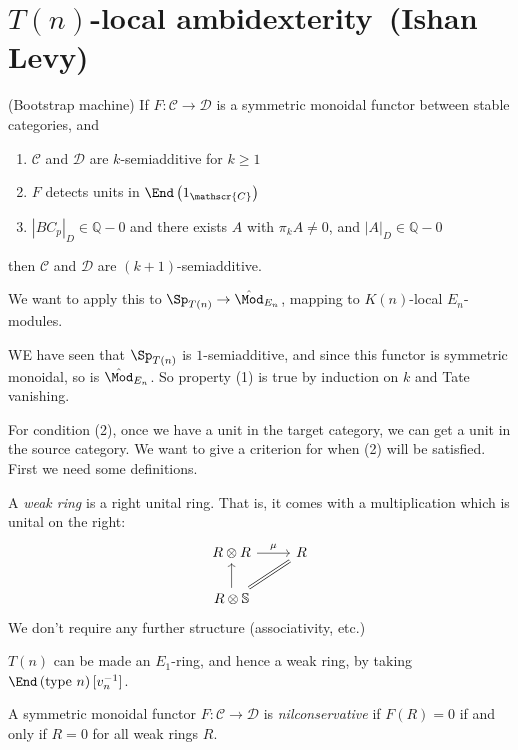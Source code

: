 \renewcommand{\thespeaker}{Ishan Levy}
\renewcommand{\thetitle}{$T(n)$-local ambidexterity}
\section{\thetitle~(\thespeaker)}
\providecommand{\Supp}{\text{Supp}}

\begin{theorem} (Bootstrap machine) If $F: \mathscr{C} \to \mathscr{D}$ is a symmetric monoidal functor between stable categories, and
\begin{enumerate}
    \item $\mathscr{C}$ and $\mathscr{D}$ are $k$-semiadditive for $k\ge 1$
    \item $F$ detects units in $\End \left( 1_\mathscr{C} \right)$
    \item $|BC_p|_D \in \mathbb{Q}-0$ and there exists $A$ with $\pi_k A \ne 0$, and $|A|_D \in \mathbb{Q}-0$
\end{enumerate}
then $\mathscr{C}$ and $\mathscr{D}$ are $(k+1)$-semiadditive.
\end{theorem}

We want to apply this to $\Sp_{T(n)} \to \hat{\Mod}_{E_n}$, mapping to $K(n)$-local $E_n$-modules.

WE have seen that $\Sp_{T(n)}$ is $1$-semiadditive, and since this functor is symmetric monoidal, so is $\hat{\Mod}_{E_n}$. So property (1) is true by induction on $k$ and Tate vanishing.

For condition (2), once we have a unit in the target category, we can get a unit in the source category. We want to give a criterion for when (2) will be satisfied. First we need some definitions.

\begin{definition} A \textit{weak ring} is a right unital ring. That is, it comes with a multiplication which is unital on the right:
\[ \begin{tikzcd}
    R \otimes R\rar["\mu"] & R\\
    R \otimes \mathbb{S}\uar\ar[ur,equal] & 
\end{tikzcd} \]
We don't require any further structure (associativity, etc.)
\end{definition}

$T(n)$ can be made an $E_1$-ring, and hence a weak ring, by taking $\End \left( \text{type } n \right)[v_n^{-1}]$.

\begin{definition} A symmetric monoidal functor $F: \mathscr{C} \to \mathscr{D}$ is \textit{nilconservative} if $F(R) = 0$ if and only if $R=0$ for all weak rings $R$.
\end{definition}

